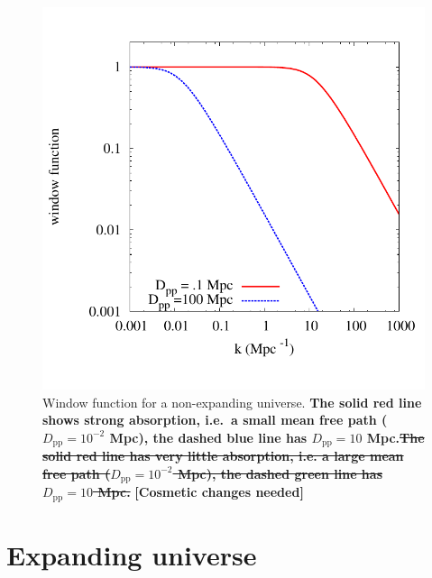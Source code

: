 \documentclass[numberedappendix]{emulateapj}
\newcommand\ALc[1]{{\color{red} \bf #1}} %
\newcommand\Cc[1]{{\color{blue} \bf #1}} %
\begin{document}
{\begin{figure}
\centering
\includegraphics[width = .45\textwidth ]{newtonian_window}
\caption{Window function for a non-expanding universe. \Cc{The solid red line
    shows strong absorption, i.e.{\ }a small mean free path
    ($D_{\mathrm{pp}}=10^{-2}$ Mpc), the dashed blue line has
    $D_{\mathrm{pp}}=10 $ Mpc.\sout{The solid red line has very little
      absorption, i.e. a large mean free path ($D_{\mathrm{pp}}=10^{-2}$ Mpc),
      the dashed green line has $D_{\mathrm{pp}}=10 $ Mpc.}}\ALc{[{Cosmetic
      changes needed}]}}
\label{fig:window_newt}
\end{figure}


\section{Expanding universe}\label{sec:window_exp}

}
\end{document}
